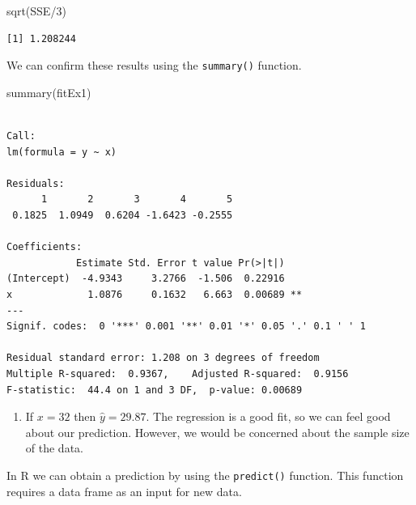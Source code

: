 \documentclass[
  letterpaper,
  DIV=11,
  numbers=noendperiod]{scrreprt}
\newenvironment{Shaded}{\begin{snugshade}}{\end{snugshade}}
\newcommand{\DecValTok}[1]{\textcolor[rgb]{0.68,0.00,0.00}{#1}}
\newcommand{\FunctionTok}[1]{\textcolor[rgb]{0.28,0.35,0.67}{#1}}
\newcommand{\NormalTok}[1]{\textcolor[rgb]{0.00,0.23,0.31}{#1}}
\newcommand{\SpecialCharTok}[1]{\textcolor[rgb]{0.37,0.37,0.37}{#1}}
\providecommand{\tightlist}{%
  \setlength{\itemsep}{0pt}\setlength{\parskip}{0pt}}\usepackage{longtable,booktabs,array}
\begin{document}
\begin{Shaded}
\begin{Highlighting}[numbers=left,,]
\FunctionTok{sqrt}\NormalTok{(SSE}\SpecialCharTok{/}\DecValTok{3}\NormalTok{)}
\end{Highlighting}
\end{Shaded}

\begin{verbatim}
[1] 1.208244
\end{verbatim}

We can confirm these results using the \texttt{summary()} function.

\begin{Shaded}
\begin{Highlighting}[numbers=left,,]
\FunctionTok{summary}\NormalTok{(fitEx1)}
\end{Highlighting}
\end{Shaded}

\begin{verbatim}

Call:
lm(formula = y ~ x)

Residuals:
      1       2       3       4       5 
 0.1825  1.0949  0.6204 -1.6423 -0.2555 

Coefficients:
            Estimate Std. Error t value Pr(>|t|)   
(Intercept)  -4.9343     3.2766  -1.506  0.22916   
x             1.0876     0.1632   6.663  0.00689 **
---
Signif. codes:  0 '***' 0.001 '**' 0.01 '*' 0.05 '.' 0.1 ' ' 1

Residual standard error: 1.208 on 3 degrees of freedom
Multiple R-squared:  0.9367,    Adjusted R-squared:  0.9156 
F-statistic:  44.4 on 1 and 3 DF,  p-value: 0.00689
\end{verbatim}

\begin{blackbox}

\begin{enumerate}
\def\labelenumi{\arabic{enumi}.}
\setcounter{enumi}{2}
\tightlist
\item
  If \(x=32\) then \(\hat{y}=29.87\). The regression is a good fit, so
  we can feel good about our prediction. However, we would be concerned
  about the sample size of the data.
\end{enumerate}

\end{blackbox}

In R we can obtain a prediction by using the \texttt{predict()}
function. This function requires a data frame as an input for new data.
\end{document}
